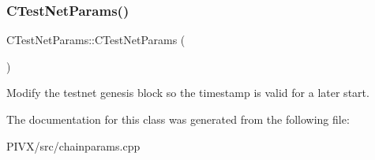 \subsubsection{\texorpdfstring{C\+Test\+Net\+Params()}{CTestNetParams()}}
{\footnotesize\ttfamily C\+Test\+Net\+Params\+::\+C\+Test\+Net\+Params (\begin{DoxyParamCaption}{ }\end{DoxyParamCaption})\hspace{0.3cm}{\ttfamily [inline]}}

Modify the testnet genesis block so the timestamp is valid for a later start. 

The documentation for this class was generated from the following file\+:\begin{DoxyCompactItemize}
\item 
P\+I\+V\+X/src/chainparams.\+cpp\end{DoxyCompactItemize}
